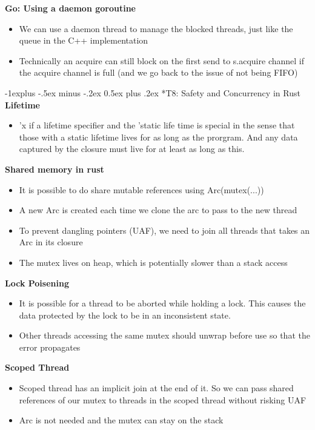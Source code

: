 \documentclass[10pt, landscape]{article}
\makeatletter
\renewcommand{\subsection}{\@startsection{subsection}{2}{0mm}%
                                {-1explus -.5ex minus -.2ex}%
                                {0.5ex plus .2ex}%
                                {\normalfont\normalsize\bfseries}}
\makeatother
\begin{document}
\begin{multicols}{4}
\textbf{Go: Using a daemon goroutine} \\ 
\begin{itemize}
    \item We can use a daemon thread to manage the blocked threads, just like the queue in the C++ implementation 
    \item Technically an acquire can still block on the first send to s.acquire channel if the acquire channel is full (and we go back to the issue of not being FIFO)
\end{itemize}

\subsection*{T8: Safety and Concurrency in Rust} 
\textbf{Lifetime} \\ 
\begin{itemize}
    \item 'x if a lifetime specifier and the 'static life time is special in the sense that those with a static lifetime lives for as long as the prorgram. And any data captured by the closure must live for at least as long as this. 
\end{itemize}

\textbf{Shared memory in rust} \\
\begin{itemize}
    \item It is possible to do share mutable references using Arc(mutex(...))
    \item A new Arc is created each time we clone the arc to pass to the new thread 
    \item To prevent dangling pointers (UAF), we need to join all threads that takes an Arc in its closure 
    \item The mutex lives on heap, which is potentially slower than a stack access
\end{itemize}

\textbf{Lock Poisening} \\
\begin{itemize}
    \item It is possible for a thread to be aborted while holding a lock. This causes the data protected by the lock to be in an inconsistent state.
    \item Other threads accessing the same mutex should unwrap before use so that the error propagates 
\end{itemize}

\textbf{Scoped Thread} \\
\begin{itemize}
    \item Scoped thread has an implicit join at the end of it. So we can pass shared references of our mutex to threads in the scoped thread without risking UAF
    \item Arc is not needed and the mutex can stay on the stack
\end{itemize}


\end{multicols}
\end{document}
